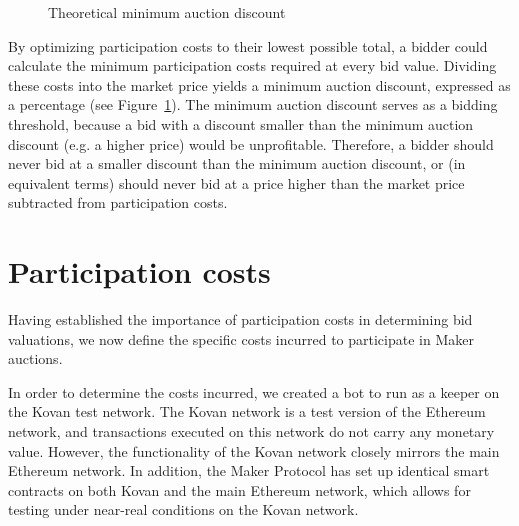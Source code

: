 \documentclass[conference]{IEEEtran}
\begin{document}
\begin{center}
    \begin{figure}[htb]
        \caption{Theoretical minimum auction discount}
        \label{fig:chart9}
    \end{figure}
\end{center}

By optimizing participation costs to their lowest possible total, a bidder could calculate the minimum participation costs required at every bid value. Dividing these costs into the market price yields a minimum auction discount, expressed as a percentage (see Figure~\ref{fig:chart9}). The minimum auction discount serves as a bidding threshold, because a bid with a discount smaller than the minimum auction discount (e.g. a higher price) would be unprofitable. Therefore, a bidder should never bid at a smaller discount than the minimum auction discount, or (in equivalent terms) should never bid at a price higher than the market price subtracted from participation costs.

\section{Participation costs}
\label{sec:costs}
Having established the importance of participation costs in determining bid valuations, we now define the specific costs incurred to participate in Maker auctions. 

In order to determine the costs incurred, we created a bot to run as a keeper on the Kovan test network. The Kovan network is a test version of the Ethereum network, and transactions executed on this network do not carry any monetary value. However, the functionality of the Kovan network closely mirrors the main Ethereum network. In addition, the Maker Protocol has set up identical smart contracts on both Kovan and the main Ethereum network, which allows for testing under near-real conditions on the Kovan network.
\end{document}
